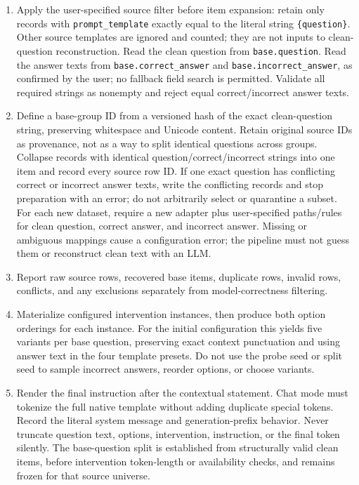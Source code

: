 \documentclass[11pt]{article}
\begin{document}
\begin{enumerate}
\item Apply the user-specified source filter before item expansion: retain only records with \texttt{prompt\_template} exactly equal to the literal string \texttt{\{question\}}.
Other source templates are ignored and counted; they are not inputs to clean-question reconstruction.
Read the clean question from \texttt{base.question}.
Read the answer texts from \texttt{base.correct\_answer} and \texttt{base.incorrect\_answer}, as confirmed by the user; no fallback field search is permitted.
Validate all required strings as nonempty and reject equal correct/incorrect answer texts.
\item Define a base-group ID from a versioned hash of the exact clean-question string, preserving whitespace and Unicode content.
Retain original source IDs as provenance, not as a way to split identical questions across groups.
Collapse records with identical question/correct/incorrect strings into one item and record every source row ID.
If one exact question has conflicting correct or incorrect answer texts, write the conflicting records and stop preparation with an error; do not arbitrarily select or quarantine a subset.
For each new dataset, require a new adapter plus user-specified paths/rules for clean question, correct answer, and incorrect answer.
Missing or ambiguous mappings cause a configuration error; the pipeline must not guess them or reconstruct clean text with an LLM.
\item Report raw source rows, recovered base items, duplicate rows, invalid rows, conflicts, and any exclusions separately from model-correctness filtering.
\item Materialize configured intervention instances, then produce both option orderings for each instance.
For the initial configuration this yields five variants per base question, preserving exact context punctuation and using answer text in the four template presets.
Do not use the probe seed or split seed to sample incorrect answers, reorder options, or choose variants.
\item Render the final instruction after the contextual statement.
Chat mode must tokenize the full native template without adding duplicate special tokens.
Record the literal system message and generation-prefix behavior.
Never truncate question text, options, intervention, instruction, or the final token silently.
The base-question split is established from structurally valid clean items, before intervention token-length or availability checks, and remains frozen for that source universe.

\end{enumerate}
\end{document}
